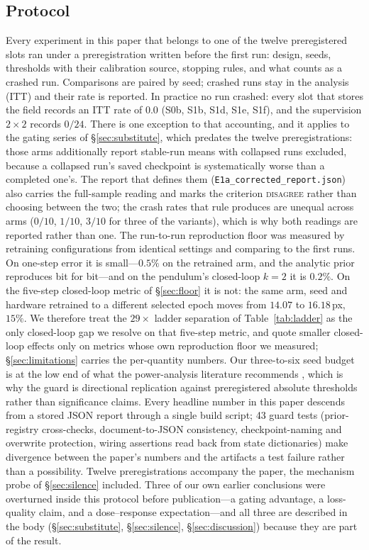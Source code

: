 \documentclass{article}
\begin{document}
\subsection{Protocol}

Every experiment in this paper that belongs to one of the twelve preregistered slots ran under a preregistration written before the first run: design, seeds, thresholds with their calibration source, stopping rules, and what counts as a crashed run. Comparisons are paired by seed; crashed runs stay in the analysis (ITT) and their rate is reported. In practice no run crashed: every slot that stores the field records an ITT rate of $0.0$ (S0b, S1b, S1d, S1e, S1f), and the supervision $2\times2$ records $0/24$. There is one exception to that accounting, and it applies to the gating series of \S\ref{sec:substitute}, which predates the twelve preregistrations: those arms additionally report stable-run means with collapsed runs excluded, because a collapsed run's saved checkpoint is systematically worse than a completed one's. The report that defines them (\texttt{E1a\_corrected\_report.json}) also carries the full-sample reading and marks the criterion \textsc{disagree} rather than choosing between the two; the crash rates that rule produces are unequal across arms ($0/10$, $1/10$, $3/10$ for three of the variants), which is why both readings are reported rather than one. The run-to-run reproduction floor was measured by retraining configurations from identical settings and comparing to the first runs. On one-step error it is small---$0.5\%$ on the retrained arm, and the analytic prior reproduces bit for bit---and on the pendulum's closed-loop $k{=}2$ it is $0.2\%$. On the five-step closed-loop metric of \S\ref{sec:floor} it is not: the same arm, seed and hardware retrained to a different selected epoch moves from $14.07$ to $16.18$\,px, $15\%$. We therefore treat the $29\times$ ladder separation of Table~\ref{tab:ladder} as the only closed-loop gap we resolve on that five-step metric, and quote smaller closed-loop effects only on metrics whose own reproduction floor we measured; \S\ref{sec:limitations} carries the per-quantity numbers. Our three-to-six seed budget is at the low end of what the power-analysis literature recommends \citep{colas2018}, which is why the guard is directional replication against preregistered absolute thresholds rather than significance claims. Every headline number in this paper descends from a stored JSON report through a single build script; 43 guard tests (prior-registry cross-checks, document-to-JSON consistency, checkpoint-naming and overwrite protection, wiring assertions read back from state dictionaries) make divergence between the paper's numbers and the artifacts a test failure rather than a possibility. Twelve preregistrations accompany the paper, the mechanism probe of \S\ref{sec:silence} included. Three of our own earlier conclusions were overturned inside this protocol before publication---a gating advantage, a loss-quality claim, and a dose--response expectation---and all three are described in the body (\S\ref{sec:substitute}, \S\ref{sec:silence}, \S\ref{sec:discussion}) because they are part of the result.
\end{document}
